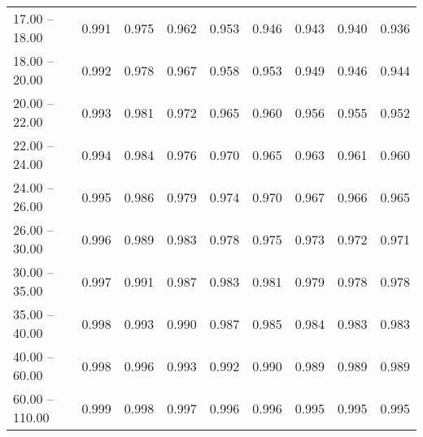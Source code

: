 \begin{table}[htp]
\begin{tiny}
\begin{center}
\begin{tabular}{|l|c|c|c|c|c|c|c|c|}
      17.00 -- 18.00 &  0.991 & 0.975 & 0.962 & 0.953 & 0.946 & 0.943 & 0.940 & 0.936 \\ 
      18.00 -- 20.00 &  0.992 & 0.978 & 0.967 & 0.958 & 0.953 & 0.949 & 0.946 & 0.944 \\ 
      20.00 -- 22.00 &  0.993 & 0.981 & 0.972 & 0.965 & 0.960 & 0.956 & 0.955 & 0.952 \\ 
      22.00 -- 24.00 &  0.994 & 0.984 & 0.976 & 0.970 & 0.965 & 0.963 & 0.961 & 0.960 \\ 
      24.00 -- 26.00 &  0.995 & 0.986 & 0.979 & 0.974 & 0.970 & 0.967 & 0.966 & 0.965 \\ 
      26.00 -- 30.00 &  0.996 & 0.989 & 0.983 & 0.978 & 0.975 & 0.973 & 0.972 & 0.971 \\ 
      30.00 -- 35.00 &  0.997 & 0.991 & 0.987 & 0.983 & 0.981 & 0.979 & 0.978 & 0.978 \\ 
      35.00 -- 40.00 &  0.998 & 0.993 & 0.990 & 0.987 & 0.985 & 0.984 & 0.983 & 0.983 \\ 
      40.00 -- 60.00 &  0.998 & 0.996 & 0.993 & 0.992 & 0.990 & 0.989 & 0.989 & 0.989 \\ 
      60.00 -- 110.00 &  0.999 & 0.998 & 0.997 & 0.996 & 0.996 & 0.995 & 0.995 & 0.995 \\ 
\hline
\end{tabular} 
             \end{center} 
             \end{tiny} 
             \label{tab:sa_offN_psi2s8} 
             \end{table}


\clearpage
